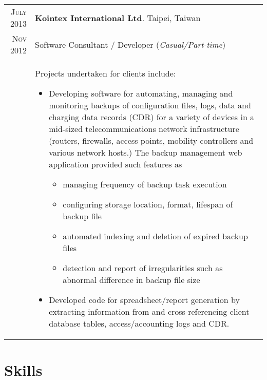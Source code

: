 \documentclass[a4paper,10pt]{article} %
\begin{document}
\begin{longtable}{r|p{13.8cm}}
  \textsc{July 2013} & \textbf{Kointex International Ltd}. \hfill Taipei, Taiwan \\
  \textsc{Nov 2012}  & Software Consultant / Developer     \hfill (\emph{Casual/Part-time}) \\
  & {\scriptsize
      Projects undertaken for clients include:
      \begin{itemize}
        \item Developing software for automating, managing and monitoring backups of 
          configuration files, logs, data and charging data records (CDR) for a variety of 
          devices in a mid-sized telecommunications network infrastructure (routers, 
          firewalls, access points, mobility controllers and various network hosts.)
          The backup management web application provided such features as 
          \begin{itemize}
            \item managing frequency of backup task execution
            \item configuring storage location, format, lifespan of backup file
            \item automated indexing and deletion of expired backup files
            \item detection and report of irregularities such as abnormal difference 
              in backup file size 
          \end{itemize}
        \item Developed code for spreadsheet/report generation by extracting information 
          from and cross-referencing client database tables, access/accounting logs and CDR.
      \end{itemize}
    }
\end{longtable}


\section{Skills}
\end{document}
